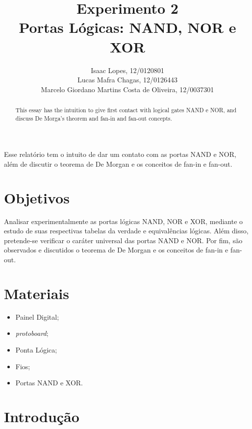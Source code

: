\documentclass[12pt]{article}
\title{Experimento 2\\ 
	Portas Lógicas: NAND, NOR e XOR }
\author{Isaac Lopes, 12/0120801\\
	Lucas Mafra Chagas, 12/0126443 \\
	Marcelo Giordano Martins Costa de Oliveira,  12/0037301
}
\begin{document}
 
	
	\maketitle
	
	\begin{abstract}
		This essay has the intuition to give first contact with logical gates NAND e NOR, and discuss De Morga's theorem and fan-in and fan-out concepts.
	\end{abstract}
	
	\begin{resumo} 
		Esse relatório tem o intuito de dar um contato com as portas NAND e NOR, além de discutir o teorema de De Morgan e os conceitos de fan-in e fan-out.
	\end{resumo}
	
	\section{Objetivos}
	\label{sec:Objetivos}
	
	Analisar experimentalmente as portas lógicas NAND, NOR e XOR, mediante o estudo de suas respectivas tabelas da verdade e equivalências lógicas. Além disso, pretende-se verificar o caráter universal das portas NAND e NOR. Por fim, são observados e discutidos o teorema de De Morgan e os conceitos de fan-in e fan-out. 
	
	\section{Materiais} 
	\label{sec:Materiais}
	
	\begin{itemize}
		\item Painel Digital;
		
		\item \textit{protoboard};
		
		\item Ponta Lógica;
		
		\item Fios;
		
		\item Portas NAND e XOR.
		
	\end{itemize}
	
	\section{Introdução}
	\label{sec:Introducao}
	
\end{document}
